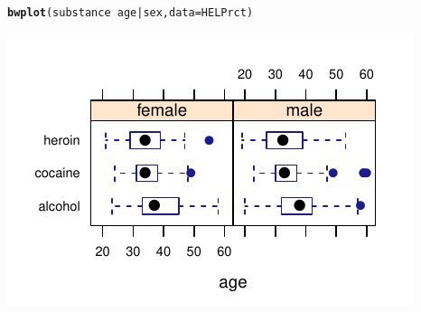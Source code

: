 \documentclass[twoside]{book}\usepackage[]{graphicx}\usepackage[]{xcolor}
\makeatletter
\def\maxwidth{ %
  \ifdim\Gin@nat@width>\linewidth
    \linewidth
  \else
    \Gin@nat@width
  \fi
}
\newcommand{\hlopt}[1]{\textcolor[rgb]{0,0,0}{#1}}%
\newcommand{\hlstd}[1]{\textcolor[rgb]{0.345,0.345,0.345}{#1}}%
\newcommand{\hlkwc}[1]{\textcolor[rgb]{0.333,0.667,0.333}{#1}}%
\newcommand{\hlkwd}[1]{\textcolor[rgb]{0.737,0.353,0.396}{\textbf{#1}}}%
\newenvironment{kframe}{%
 \def\at@end@of@kframe{}%
 \ifinner\ifhmode%
  \def\at@end@of@kframe{\end{minipage}}%
  \begin{minipage}{\columnwidth}%
 \fi\fi%
 \def\FrameCommand##1{\hskip\@totalleftmargin \hskip-\fboxsep
 \colorbox{shadecolor}{##1}\hskip-\fboxsep
     \hskip-\linewidth \hskip-\@totalleftmargin \hskip\columnwidth}%
 \MakeFramed {\advance\hsize-\width
   \@totalleftmargin\z@ \linewidth\hsize
   \@setminipage}}%
 {\par\unskip\endMakeFramed%
 \at@end@of@kframe}
\newenvironment{knitrout}{}{} %
\makeatother
\begin{document}
\begin{knitrout}
\color{fgcolor}\begin{kframe}
\begin{alltt}
\hlkwd{bwplot}\hlstd{(substance} \hlopt{~} \hlstd{age} \hlopt{|} \hlstd{sex,} \hlkwc{data}\hlstd{=HELPrct)}
\end{alltt}
\end{kframe}

{\centering \includegraphics[width=\maxwidth]{figures/fig-bwplot3-1} 

}



\end{knitrout}
\end{document}
